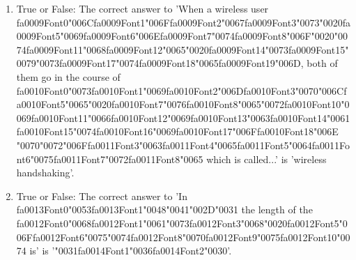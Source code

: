 \documentclass[12pt]{article}
\begin{document}
\begin{enumerate}[label=\arabic*.]
\item True or False: The correct answer to 'When a wireless user {\csname fa0009Font0\endcsname\char"006C}{\csname fa0009Font1\endcsname\char"006F}{\csname fa0009Font2\endcsname\char"0067}{\csname fa0009Font3\endcsname\char"0073}{\char"0020}{\csname fa0009Font5\endcsname\char"0069}{\csname fa0009Font6\endcsname\char"006E}{\csname fa0009Font7\endcsname\char"0074}{\csname fa0009Font8\endcsname\char"006F}{\char"0020}{\char"0074}{\csname fa0009Font11\endcsname\char"0068}{\csname fa0009Font12\endcsname\char"0065}{\char"0020}{\csname fa0009Font14\endcsname\char"0073}{\csname fa0009Font15\endcsname\char"0079}{\char"0073}{\csname fa0009Font17\endcsname\char"0074}{\csname fa0009Font18\endcsname\char"0065}{\csname fa0009Font19\endcsname\char"006D}, both of them go in the course of {\csname fa0010Font0\endcsname\char"0073}{\csname fa0010Font1\endcsname\char"0069}{\csname fa0010Font2\endcsname\char"006D}{\csname fa0010Font3\endcsname\char"0070}{\char"006C}{\csname fa0010Font5\endcsname\char"0065}{\char"0020}{\csname fa0010Font7\endcsname\char"0076}{\csname fa0010Font8\endcsname\char"0065}{\char"0072}{\csname fa0010Font10\endcsname\char"0069}{\csname fa0010Font11\endcsname\char"0066}{\csname fa0010Font12\endcsname\char"0069}{\csname fa0010Font13\endcsname\char"0063}{\csname fa0010Font14\endcsname\char"0061}{\csname fa0010Font15\endcsname\char"0074}{\csname fa0010Font16\endcsname\char"0069}{\csname fa0010Font17\endcsname\char"006F}{\csname fa0010Font18\endcsname\char"006E} {\char"0070}{\char"0072}{\char"006F}{\csname fa0011Font3\endcsname\char"0063}{\csname fa0011Font4\endcsname\char"0065}{\csname fa0011Font5\endcsname\char"0064}{\csname fa0011Font6\endcsname\char"0075}{\csname fa0011Font7\endcsname\char"0072}{\csname fa0011Font8\endcsname\char"0065} which is called...' is 'wireless handshaking'.
\item True or False: The correct answer to 'In {\csname fa0013Font0\endcsname\char"0053}{\csname fa0013Font1\endcsname\char"0048}{\char"0041}{\char"002D}{\char"0031} the length of the {\csname fa0012Font0\endcsname\char"0068}{\csname fa0012Font1\endcsname\char"0061}{\char"0073}{\csname fa0012Font3\endcsname\char"0068}{\char"0020}{\csname fa0012Font5\endcsname\char"006F}{\csname fa0012Font6\endcsname\char"0075}{\char"0074}{\csname fa0012Font8\endcsname\char"0070}{\csname fa0012Font9\endcsname\char"0075}{\csname fa0012Font10\endcsname\char"0074} is' is '{\char"0031}{\csname fa0014Font1\endcsname\char"0036}{\csname fa0014Font2\endcsname\char"0030}'.

\end{enumerate}
\end{document}

